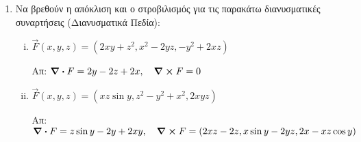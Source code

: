 \documentclass[a4paper,12pt]{article}
\begin{document}
\begin{enumerate}
\item Να βρεθούν η απόκλιση και ο στροβιλισμός για τις παρακάτω διανυσματικές συναρτήσεις (Διανυσματικά Πεδία):
\begin{enumerate}[i)]

\item $\vec{F}(x,y,z)=(2xy+z^2,x^2-2yz,-y^2+2xz)$

\hfill Απ: $\div F = 2y-2z+2x,\quad  \curl F=0$

\item $\vec{F}(x,y,z)=(xz\sin y, z^2-y^2+x^2, 2xyz)$

\hfill Απ: $\div F = z\sin y-2y+2xy,  \quad \curl F=(2xz-2z,x\sin y-2yz,2x-xz\cos y)$
\end{enumerate}

\end{enumerate}
\end{document}
